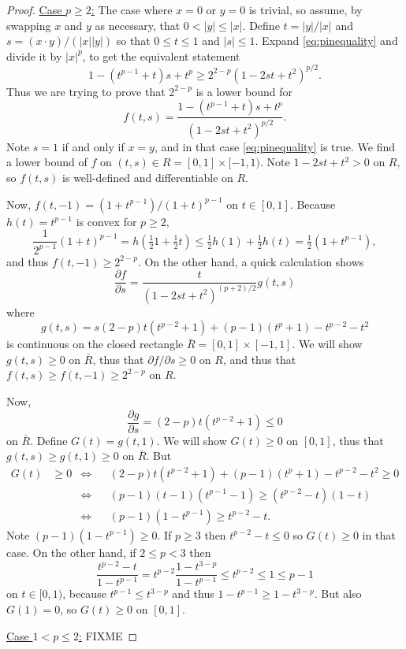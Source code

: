 \documentclass[final,leqno,onefignum,onetabnum]{siamltex1213bueler}
\begin{document}
\begin{proof}  \underline{Case $p \ge 2$:}  The case where $x=0$ or $y=0$ is trivial, so assume, by swapping $x$ and $y$ as necessary, that $0 < |y| \le |x|$.  Define $t=|y|/|x|$ and $s = (x\cdot y)/(|x||y|)$ so that $0\le t \le 1$ and $|s|\le 1$.  Expand \eqref{eq:pinequality} and divide it by $|x|^p$, to get the equivalent statement
    $$1 - (t^{p-1}+t) s + t^p \ge 2^{2-p} \left(1 - 2 s t + t^2\right)^{p/2}.$$
Thus we are trying to prove that $2^{2-p}$ is a lower bound for
	$$f(t,s) = \frac{1 - (t^{p-1}+t) s + t^p}{\left(1 - 2 s t + t^2\right)^{p/2}}.$$
Note $s=1$ if and only if $x=y$, and in that case \eqref{eq:pinequality} is true.  We find a lower bound of $f$ on $(t,s) \in R=[0,1]\times[-1,1)$.  Note $1-2st+t^2 > 0$ on $ R$, so $f(t,s)$ is well-defined and differentiable on $R$.

Now, $f(t,-1) = \left(1 + t^{p-1}\right) / \left(1 + t\right)^{p-1}$ on $t\in[0,1]$.  Because $h(t)=t^{p-1}$ is convex for $p \ge 2$,
    $$\frac{1}{2^{p-1}} (1+t)^{p-1} = h(\tfrac{1}{2} 1 + \tfrac{1}{2} t) \le \tfrac{1}{2} h(1) + \tfrac{1}{2} h(t) = \tfrac{1}{2} (1 + t^{p-1}),$$
and thus $f(t,-1) \ge 2^{2-p}$.  On the other hand, a quick calculation shows
    $$\frac{\partial f}{\partial s} = \frac{t}{\left(1 - 2 s t + t^2\right)^{(p+2)/2}} g(t,s)$$
where
    $$g(t,s) = s(2-p) t (t^{p-2} + 1) + (p-1) (t^p+1) - t^{p-2} - t^2$$
is continuous on the closed rectangle $\bar R = [0,1]\times[-1,1]$.  We will show $g(t,s)\ge 0$ on $\bar R$, thus that $\partial f/\partial s \ge 0$ on $R$, and thus that $f(t,s)\ge f(t,-1) \ge  2^{2-p}$ on $R$.

Now,
    $$\frac{\partial g}{\partial s} = (2-p) t (t^{p-2} + 1) \le 0$$
on $\bar R$.  Define $G(t) = g(t,1)$.  We will show $G(t)\ge 0$ on $[0,1]$, thus that $g(t,s)\ge g(t,1)\ge 0$ on $\bar R$.  But
\begin{align*}
G(t) &\ge 0 &\iff && (2-p) t (t^{p-2} + 1) + (p-1) (t^p+1) - t^{p-2} - t^2 \ge 0 \\
          & &\iff && (p-1) (t-1) (t^{p-1}-1) \ge (t^{p-2} - t) (1 - t)  \\
          & &\iff && (p-1) (1 - t^{p-1}) \ge t^{p-2} - t.
\end{align*}
Note $(p-1) (1 - t^{p-1}) \ge 0$.  If $p\ge 3$ then $t^{p-2} - t \le 0$ so $G(t)\ge 0$ in that case.  On the other hand, if $2\le p < 3$ then
	$$\frac{t^{p-2} - t}{1 - t^{p-1}} = t^{p-2} \frac{1 - t^{3-p}}{1 - t^{p-1}} \le t^{p-2} \le 1 \le p-1$$
on $t\in[0,1)$, because $t^{p-1}\le t^{3-p}$ and thus $1 - t^{p-1} \ge 1 - t^{3-p}$.  But also $G(1)=0$, so $G(t)\ge 0$ on $[0,1]$.

\noindent \underline{Case $1 < p \le 2$:}  FIXME
\end{proof}
\end{document}
